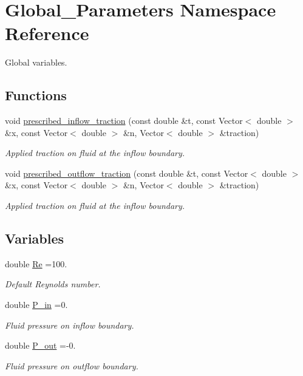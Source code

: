 \hypertarget{namespaceGlobal__Parameters}{}\section{Global\+\_\+\+Parameters Namespace Reference}
\label{namespaceGlobal__Parameters}


Global variables.  


\subsection*{Functions}
\begin{DoxyCompactItemize}
\item 
void \hyperlink{namespaceGlobal__Parameters_af7faf65214ed9ead637f7c208addb095}{prescribed\+\_\+inflow\+\_\+traction} (const double \&t, const Vector$<$ double $>$ \&x, const Vector$<$ double $>$ \&n, Vector$<$ double $>$ \&traction)
\begin{DoxyCompactList}\small\item\em Applied traction on fluid at the inflow boundary. \end{DoxyCompactList}\item 
void \hyperlink{namespaceGlobal__Parameters_a83155358b144cff7e29ecb6b209a2d3e}{prescribed\+\_\+outflow\+\_\+traction} (const double \&t, const Vector$<$ double $>$ \&x, const Vector$<$ double $>$ \&n, Vector$<$ double $>$ \&traction)
\begin{DoxyCompactList}\small\item\em Applied traction on fluid at the inflow boundary. \end{DoxyCompactList}\end{DoxyCompactItemize}
\subsection*{Variables}
\begin{DoxyCompactItemize}
\item 
double \hyperlink{namespaceGlobal__Parameters_a9d72e94a9305c6a310940a6a427ebe06}{Re} =100.
\begin{DoxyCompactList}\small\item\em Default Reynolds number. \end{DoxyCompactList}\item 
double \hyperlink{namespaceGlobal__Parameters_a05b26d00935600b5e0149872844f224c}{P\+\_\+in} =0.
\begin{DoxyCompactList}\small\item\em Fluid pressure on inflow boundary. \end{DoxyCompactList}\item 
double \hyperlink{namespaceGlobal__Parameters_ac680ed856897793d54c9c867da19169c}{P\+\_\+out} =-\/0.
\begin{DoxyCompactList}\small\item\em Fluid pressure on outflow boundary. \end{DoxyCompactList}\end{DoxyCompactItemize}


